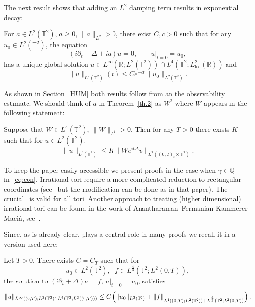 \documentclass[AHL, Unicode, longabstracts]{cedram}
\newcommand{\R}{{\mathbb R}}
\newcommand{\TT}{{\mathbb T}}
\newcommand{\TT}{{\mathbb T}}
\newcommand{\R}{{\mathbb R}}
\newcommand{\loc}{\mathrm{loc}}
\begin{document}
The next result shows that adding an $ L^2 $ damping term results in exponential decay:

\begin{theo}\label{th.3}
For $a\in L^2(\TT^2)$, $ a \geq 0 $, $ \| a \|_{L^2} > 0$, there exist $C, c>0$ such that for any $u_0 \in L^2(\TT^2)$, the equation
\begin{equation}\label{damped}
(i \partial_t + \Delta + ia) u=0, \qquad u |_{t=0} = u_0,
\end{equation}
has a unique global solution $ u \in L^\infty(\R; L^2(\TT^2))\cap L^4(\TT^2; L^2_{\loc}(\R)) $ and
\begin{equation}\label{dampedbis}
\| u\|_{L^2(\TT^2)} (t) \leq C e^{-ct} \| u_0 \|_{L^2(\TT^2)}.
\end{equation}
\end{theo}

As shown in Section~\ref{HUM} both results follow from an the observability estimate. We should think of $ a $ in Theorem~\ref{th.2} as $ W^2 $ where $ W $ appears in the following statement:

\begin{theo}\label{th.1}
Suppose that $ W \in L^4 (\TT^2) $, $ \| W \|_{L^4} >0 $. Then for any $ T > 0$ there exists $ K $ such that for $ u \in L^2 (\TT^2) $,
\begin{equation}\label{eq:th1}
\| u \|_{ L^2 (\TT^2) } \leq K \| W e^{ it \Delta} u \|_{ L^2 ((0,T)_t \times \TT^2) }.
\end{equation}
\end{theo}

To keep the paper easily accessible we present proofs in the case when $ \gamma \in \mathbb Q $ in~\eqref{eq:con}. Irrational tori require a more complicated reduction to rectangular coordinates (see~\cite[Lemma~2.7 and Figure~1]{BZ4} but the modification can be done as in that paper). The crucial~\cite[Proposition~2.2]{BBZ} is valid for all tori. Another approach to treating (higher dimensional) irrational tori can be found in the work of Anantharaman--Fermanian-Kammerer--Macià, see~\cite[Corollary~1.19, Theorem~1.20]{AFM}.

Since, as is already clear, \cite[Proposition~2.2]{BBZ} plays a central role in many proofs we recall it in a version used here:

\begin{theo}\label{th.BBZ}
Let $ T > 0 $. There exists $ C = C_T $ such that for
\[
u_0\in L^2(\TT^2), \ \ \ f \in L^{\frac 4 3 } (\TT^2 ; L^2(0, T)),
\]
the solution to $ (i \partial_t + \Delta) u =f$, $ u|_{t=0} = u_0$, satisfies
\[
\| u\|_{L^\infty ((0, T) ; L^2 (\TT^2) \cap L^4(\TT^2; L^2((0,T)))}\\
\leq C \left(\|u_0\|_{L^2(\TT^2)} + \|f\|_{ L^1 ((0,T) ; L^2 (\TT^2)) + L^{\frac 4 3 } (\TT^2 ; L^2(0, T))}\right).
\]
\end{theo}
\end{document}
